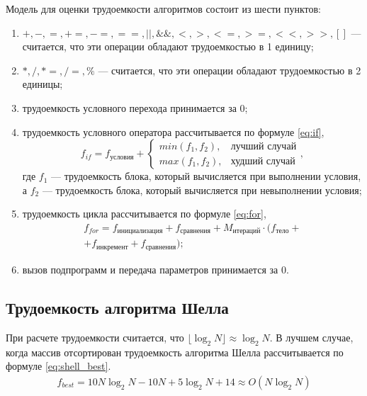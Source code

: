 Модель для оценки трудоемкости алгоритмов состоит из шести пунктов:
\begin{enumerate}
	\item $+, -, =, +=, -=, ==, ||, \&\&, <, >, <=, >=, <<, >>, []$ --- считается, что эти операции обладают трудоемкостью в 1 единицу;
	\item $*, /, *=, /=, \% $ --- считается, что эти операции обладают трудоемкостью в 2 единицы;
	\item трудоемкость условного перехода принимается за $0$;
	\item трудоемкость условного оператора рассчитывается по формуле \eqref{eq:if},
	\begin{equation}
		\label{eq:if}
		f_{if} = f_{\text{условия}} + 
		\begin{cases}
			min(f_1, f_2), & \text{лучший случай}\\
			max(f_1, f_2), & \text{худший случай}
		\end{cases},
	\end{equation}
	где $f_1$ --- трудоемкость блока, который вычисляется при выполнении условия, а $f_2$ --- трудоемкость блока, который вычисляется при невыполнении условия;
	\item трудоемкость цикла рассчитывается по формуле \eqref{eq:for},
	\begin{equation}
		\label{eq:for}
		\begin{gathered}
			f_{for} = f_{\text{инициализация}} + f_{\text{сравнения}} + M_{\text{итераций}} \cdot (f_{\text{тело}} +\\
			+ f_{\text{инкремент}} + f_{\text{сравнения}});
		\end{gathered}
	\end{equation}
	\item вызов подпрограмм и передача параметров принимается за $0$.
\end{enumerate}

\subsection{Трудоемкость алгоритма Шелла}

При расчете трудоемкости считается, что $\lfloor \log_{2}N \rfloor \approx \log_{2}N $.
В лучшем случае, когда массив отсортирован трудоемкость алгоритма Шелла рассчитывается по формуле \eqref{eq:shell_best}.
\begin{equation}
	\label{eq:shell_best}
	\begin{gathered}
		f_{best} = 10 N \log_{2}N - 10 N + 5 \log_{2}N + 14 \approx O(N\log_{2}N)
	\end{gathered}
\end{equation}
 
